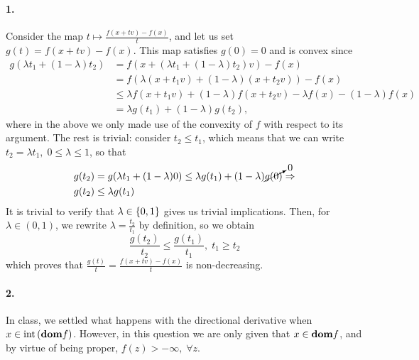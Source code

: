 \documentclass[10pt]{article}
\begin{document}
\begin{Exercise}
	\label{ex:p4}

    \paragraph{1.}

	Consider the map $t \mapsto \frac{f(x + tv) - f(x)}{t}$, and let us set
	$g(t) = f(x + tv) - f(x)$. This map satisfies $g(0) = 0$ and is convex since
	\begin{align*}
		g(\lambda t_1 + (1 - \lambda) t_2) &=
		f\left(x + (\lambda t_1 + (1 - \lambda) t_2) v \right) - f(x) \\
		&= f(\lambda (x + t_1 v) + (1 - \lambda) (x + t_2 v)) - f(x) \\
		&\leq \lambda f(x + t_1 v) + (1 - \lambda) f(x + t_2 v)
			- \lambda f(x) - (1 - \lambda) f(x) \\
		&= \lambda g(t_1) + (1 - \lambda) g(t_2),
	\end{align*}
	where in the above we only made use of the convexity of $f$ with respect to
	its argument. The rest is trivial: consider $t_2 \leq t_1$, which means that
	we can write $t_2 = \lambda t_1, \; 0 \leq \lambda \leq 1$, so that
	\begin{align*}
		g(t_2) &= g(\lambda t_1 + (1 - \lambda) 0) \leq
			\lambda g(t_1) + (1 - \lambda) \cancelto{0}{g(0)} \Rightarrow \\
			g(t_2) &\leq \lambda g(t_1)
	\end{align*}
	It is trivial to verify that $\lambda \in \left\{ 0, 1 \right\}$ gives us trivial
	implications. Then, for $\lambda \in (0, 1)$, we rewrite $\lambda =
	\frac{t_2}{t_1}$ by definition, so we obtain
	\[
		\frac{g(t_2)}{t_2} \leq \frac{g(t_1)}{t_1}, \; t_1 \geq t_2
	\]
	which proves that $\frac{g(t)}{t} = \frac{f(x + tv) - f(x)}{t}$ is
	non-decreasing.

    \paragraph{2.}
    In class, we settled what happens with the directional derivative when
    $x \in \mathrm{int}\left( \textbf{dom} f \right)$. However, in this question we are only given that
    $x \in \textbf{dom} f$, and by virtue of being proper, $f(z) > -\infty, \; \forall
    z$.


\end{Exercise}
\end{document}
